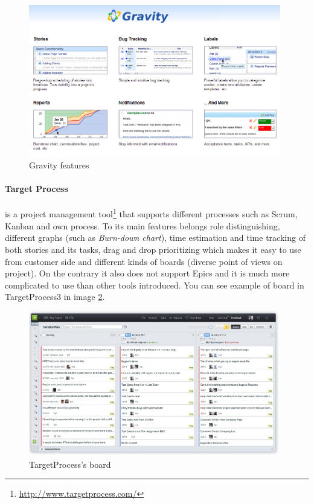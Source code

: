 \begin{figure}[!h]
	\centering
		\includegraphics[width=11cm]{preliminaryStudies/gravity.png}
	\caption{Gravity features}
	\label{img:gravity}
\end{figure}

\paragraph{Target Process} is a project management tool\footnote{\url{http://www.targetprocess.com/}} that supports different processes such as Scrum, Kanban and own process. 
To its main features belongs role distinguishing, different graphs (such as \emph{Burn-down chart}), time estimation and time tracking of both stories and its tasks, drag and drop prioritizing which makes it easy to use from customer side and different kinds of boards (diverse point of views on project).
On the contrary it also does not support Epics and it is much more complicated to use than other tools introduced.
You can see example of board in TargetProcess3 in image \ref{img:targetp}.

\begin{figure}[!t]
	\centering
		\includegraphics[width=11cm]{preliminaryStudies/targetp.png}
	\caption{TargetProcess's board}
	\label{img:targetp}
\end{figure}

